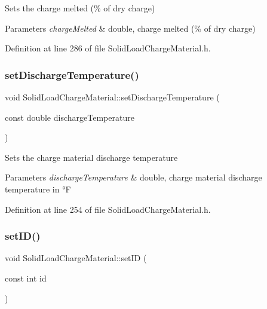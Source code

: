 Sets the charge melted (\% of dry charge) 
\begin{DoxyParams}{Parameters}
{\em charge\+Melted} & double, charge melted (\% of dry charge) \\
\hline
\end{DoxyParams}


Definition at line 286 of file Solid\+Load\+Charge\+Material.\+h.

\mbox{\label{class_solid_load_charge_material_adf73bc8d656a501cae5ad68af7a7c4fb}} 
\subsubsection{\texorpdfstring{set\+Discharge\+Temperature()}{setDischargeTemperature()}}
{\footnotesize\ttfamily void Solid\+Load\+Charge\+Material\+::set\+Discharge\+Temperature (\begin{DoxyParamCaption}\item[{const double}]{discharge\+Temperature }\end{DoxyParamCaption})\hspace{0.3cm}{\ttfamily [inline]}}

Sets the charge material discharge temperature 
\begin{DoxyParams}{Parameters}
{\em discharge\+Temperature} & double, charge material discharge temperature in °F \\
\hline
\end{DoxyParams}


Definition at line 254 of file Solid\+Load\+Charge\+Material.\+h.

\mbox{\label{class_solid_load_charge_material_a4cc8e12ffb340c94106cecf576a85ae5}} 
\subsubsection{\texorpdfstring{set\+I\+D()}{setID()}}
{\footnotesize\ttfamily void Solid\+Load\+Charge\+Material\+::set\+ID (\begin{DoxyParamCaption}\item[{const int}]{id }\end{DoxyParamCaption})\hspace{0.3cm}{\ttfamily [inline]}}

